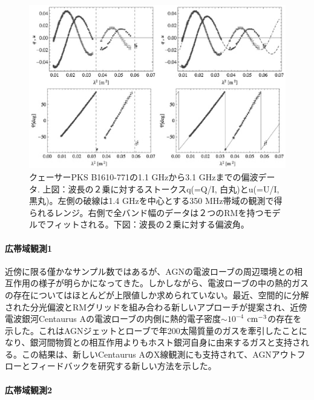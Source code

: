 \begin{figure}[tbp]
\begin{center}
\includegraphics[width=0.8\linewidth]{magnetism/c06.s2.ss4.f2.eps}
\end{center}
\caption{
クェーサーPKS B1610-771の1.1 GHzから3.1 GHzまでの偏波データ\citep{2012MNRAS.421.3300O}. 上図：波長の２乗に対するストークスq(=Q/I, 白丸)とu(=U/I, 黒丸)。左側の破線は1.4 GHzを中心とする350 MHz帯域の観測で得られるレンジ。右側で全バンド幅のデータは２つのRMを持つモデルでフィットされる。下図：波長の２乗に対する偏波角。
}\label{c06.s2.ss4.f2}
\end{figure}

\paragraph{広帯域観測1}

近傍に限る僅かなサンプル数ではあるが、AGNの電波ローブの周辺環境との相互作用の様子が明らかになってきた。しかしながら、電波ローブの中の熱的ガスの存在についてはほとんどが上限値しか求められていない\citep{1985ApJ...297...84S, 1987MNRAS.228..557L, 2004ApJ...604L..77K}。最近、空間的に分解された分光偏波とRMグリッドを組み合わる新しいアプローチが提案され\citep{2013ApJ...764..162O}、近傍電波銀河Centaurus Aの電波ローブの内側に熱的電子密度$\sim 10^{-4}$ ${\rm cm^{-3}}$の存在を示した。これはAGNジェットとローブで年200太陽質量のガスを牽引したことになり、銀河間物質との相互作用よりもホスト銀河自身に由来するガスと支持される。この結果は、新しいCentaurus AのX線観測にも支持されて、AGNアウトフローとフィードバックを研究する新しい方法を示した。

\paragraph{広帯域観測2}

